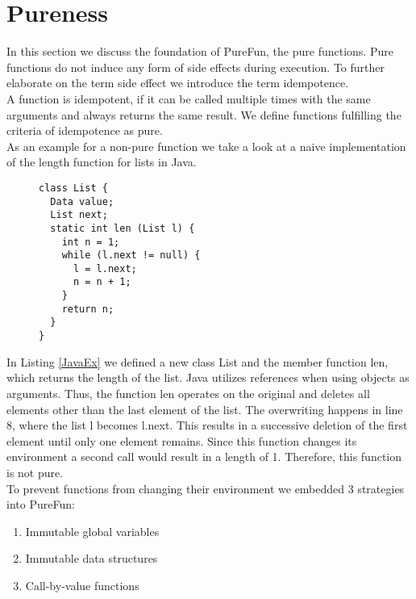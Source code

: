 \section{Pureness}
In this section we discuss the foundation of PureFun, the pure functions. Pure functions do not induce any form of side effects during execution. To further elaborate on the term side effect we introduce the term idempotence.\\
A function is idempotent, if it can be called multiple times with the same arguments and always returns the same result. We define functions fulfilling  the criteria of idempotence as pure.\\
As an example for a non-pure function we take a look at a naive implementation of the length function for lists in Java. 
\begin{figure}[h]
\begin{lstlisting}[caption={Java code that deletes its input list as a side effect.},label={JavaEx}]
class List {
  Data value;
  List next;
  static int len (List l) {
    int n = 1;
    while (l.next != null) {
      l = l.next;
      n = n + 1;
    }
    return n;
  }
}
\end{lstlisting}
\end{figure}
In Listing \ref{JavaEx} we defined a new class List and the member function len, which returns the length of the list. Java utilizes references when using objects as arguments. Thus, the function len operates on the original and deletes all elements other than the last element of the list. The overwriting happens in line 8, where the list l becomes l.next. This results in a successive deletion of the first element until only one element remains. Since this function changes its environment a second call would result in a length of 1. Therefore, this function is not pure.\\
To prevent functions from changing their environment we embedded 3 strategies into PureFun:
\begin{enumerate}
\item Immutable global variables
\item Immutable data structures
\item Call-by-value functions
\end{enumerate}
